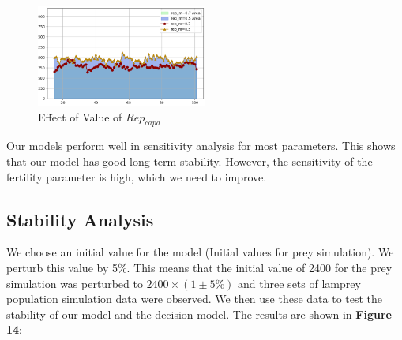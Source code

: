 \documentclass{mcmthesis}
\begin{document}
\begin{figure}[H]
  \centering
  \includegraphics[width=0.5\textwidth]{figures/7_1_figur3.png}
  \caption{Effect of Value of $Rep_{capa}$}
  \label{fig:Simulation of Disaster}
\end{figure}

Our models perform well in sensitivity analysis for most parameters. This shows that our model has good long-term stability. However, the sensitivity of the fertility parameter is high, which we need to improve.


\subsection{Stability Analysis}
We choose an initial value for the model (Initial values for prey simulation). We perturb this value by 5\%. This means that the initial value of 2400 for the prey simulation was perturbed to $2400\times (1\pm 5\%)$ and three sets of lamprey population simulation data were observed. We then use these data to test the stability of our model and the decision model. The results are shown in \textbf{Figure 14}:
\end{document}
